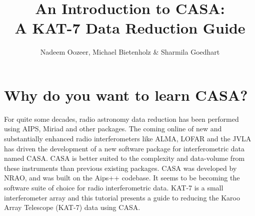 \documentclass[force,almostfull,justified]{tufte-book}
\title{An Introduction to CASA:\\ A KAT-7 Data Reduction Guide}
\author[Nadeem Oozeer]{Nadeem Oozeer, Michael Bietenholz \& Sharmila Goedhart}
\begin{document}
\frontmatter

\maketitle

\vfill
{}

\tableofcontents




\mainmatter


\chapter{Why do you want to learn CASA?}
\label{ch:introduction}

For quite some decades, radio astronomy data reduction has been performed using AIPS, Miriad and other
packages.  The coming online of new and substantially enhanced radio interferometers like ALMA, LOFAR
and the JVLA has driven the development of a new software package for interferometric data named CASA.
CASA is better suited to the complexity and data-volume from these instruments than previous existing
packages.  CASA was developed by NRAO, and was built on the Aips++ codebase.  It seems to be becoming
the software suite of choice for radio interferometric data.  KAT-7 is a small interferometer array
and this tutorial presents a guide to reducing the Karoo Array Telescope (KAT-7) data using CASA.
\end{document}
